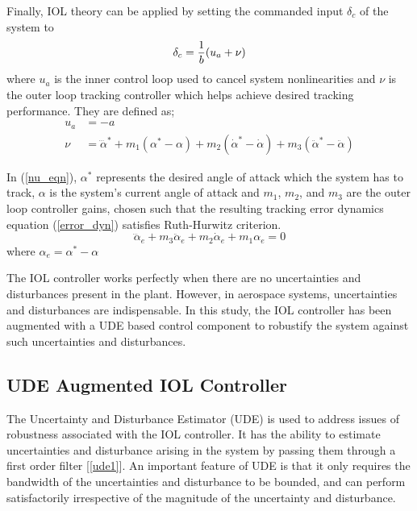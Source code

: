 \documentclass[conference]{IEEEtran}
\begin{document}
		Finally, IOL theory can be applied by setting the commanded input $\delta_c$ of the system to 
		\begin{equation}
			\delta_c = \frac{1}{b}(u_a+\nu) \\ \label{iol_control}
		\end{equation}
		where $u_a$ is the inner control loop used to cancel system nonlinearities and $\nu$ is the outer loop tracking controller which helps achieve desired tracking performance. They are defined as;
		\begin{align}
				u_a &= -a \label{ua_eqn}\\
				\nu &= \dddot{\alpha}^\ast+m_1(\alpha^\ast-\alpha) + m_2(\dot{\alpha}^\ast-\dot{\alpha}) + m_3(\ddot{\alpha}^\ast-\ddot{\alpha}) \label{nu_eqn} 
		\end{align}
		
		In (\ref{nu_eqn}), $\alpha^*$ represents the desired angle of attack which the system has to track, $\alpha$ is the system's current angle of attack and $m_1$, $m_2$, and $m_3$ are the outer loop controller gains, chosen such that the resulting tracking error dynamics equation (\ref{error_dyn}) satisfies Ruth-Hurwitz criterion.
		\begin{equation}
			\dddot{\alpha}_e + m_3\ddot{\alpha}_e + m_2\dot{\alpha}_e + m_1\alpha_e = 0 \label{error_dyn}
		\end{equation}
		where $\alpha_e = \alpha^\ast - \alpha$
		
		The IOL controller works perfectly when there are no uncertainties and disturbances present in the plant. However, in aerospace systems, uncertainties and disturbances are indispensable. In this study, the IOL controller has been augmented with a UDE based control component to robustify the system against such uncertainties and disturbances.
	
	\subsection{UDE Augmented IOL Controller}
		The Uncertainty and Disturbance Estimator (UDE) is used to address issues of robustness associated with the IOL controller. It has the ability to estimate uncertainties and disturbance arising in the system by passing them through a first order filter [\ref{ude1}]. An important feature of UDE is that it only requires the bandwidth of the uncertainties and disturbance to be bounded, and can perform satisfactorily irrespective of the magnitude of the uncertainty and disturbance.
	
\end{document}
